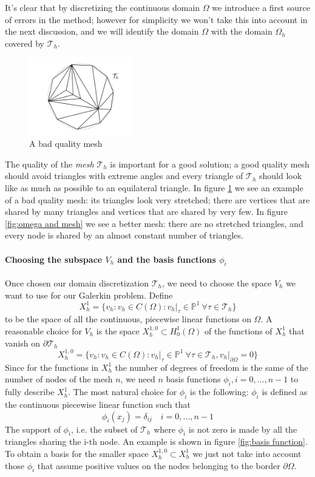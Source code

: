 It's clear that by discretizing the continuous domain $\Omega$ we introduce a first source of errors in the method; however for simplicity we won't take this into account in the next discussion, and we will identify the domain $\Omega$ with the domain $\Omega_h$covered by $\mathcal T_h$.
\begin{figure}
	\begin{center}
		\includegraphics[width=0.4\textwidth]{figs/Chapter3/badmesh.png}
	\end{center}
	\caption{\label{fig:bad mesh}A bad quality mesh}
\end{figure} The quality of the \textit{mesh} $\mathcal T_h$ is important for a good solution; a good quality mesh should avoid triangles with extreme angles and every triangle of $\mathcal T_h$ should look like as much as possible to an equilateral triangle. In figure \ref{fig:bad mesh} we see an example of a bad quality mesh: its triangles look very stretched; there are vertices that are shared by many triangles and vertices that are shared by very few. In figure \ref{fig:omega and mesh} we see a better mesh: there are no stretched triangles, and every node is shared by an almost constant number of triangles.

\paragraph{Choosing the subspace $V_h$ and the basis functions $\phi_i$}
Once chosen our domain discretization $\mathcal T_h$, we need to choose the space $V_h$ we want to use for our Galerkin problem. Define 
$$X_h^{1}=\{v_h: v_h\in C(\Omega): \left.v_h\right|_{\tau}\in\mathbb P^1\  \forall \tau\in \mathcal T_h\}$$
to be the space of all the continuous, piecewise linear functions on $\Omega$. A reasonable choice for $V_h$ is the space $X_h^{1,0}\subset H_0^1(\Omega)$ of the functions of $X_h^1$ that vanish on $\partial \mathcal T_h$
$$
X_h^{1,0}=\{v_h: v_h\in C(\Omega): \left.v_h\right|_{\tau}\in\mathbb P^1\  \forall \tau\in \mathcal T_h, \left.v_h\right|_{\partial\Omega}=0\}
$$ 
Since for the functions in $X_h^1$ the number of degrees of freedom is the same of the number of nodes of the mesh $n$, we need  $n$ basis functions $\phi_i, i=0,...,n-1$ to fully describe $X_h^{1}$. The most natural choice for $\phi_i$ is the following: $\phi_i$ is defined as the continuous piecewise linear function such that 
$$
\phi_i(x_j) = \delta_{ij}\quad i=0,...,n-1
$$
The support of $\phi_i$, i.e. the subset of $\mathcal T_h$ where $\phi_i$ is not zero is made by all the triangles sharing the i-th node. An example is shown in figure \ref{fig:basis function}. To obtain a basis for the smaller space $X_h^{1,0}\subset X_h^{1}$ we just not take into account those $\phi_i$ that assume positive values on the nodes belonging to the border $\partial\Omega$. 


